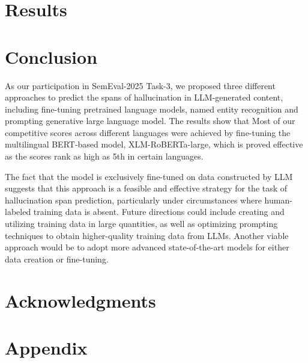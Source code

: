 \documentclass[11pt]{article}
\begin{document}
\section{Results}


\section{Conclusion}
As our participation in SemEval-2025 Task-3, we proposed three different approaches to predict the spans of hallucination in LLM-generated content, including fine-tuning pretrained language models, named entity recognition and prompting generative large language model. The results show that
Most of our competitive scores across different languages were achieved by fine-tuning the multilingual BERT-based model, XLM-RoBERTa-large, which is proved effective as the scores rank as high as 5th in certain languages.

The fact that the model is exclusively fine-tuned on data constructed by LLM suggests that this approach is a feasible and effective strategy for the task of hallucination span prediction, particularly under circumstances where human-labeled training data is absent. Future directions could include creating and utilizing training data in large quantities, as well as optimizing prompting techniques to obtain higher-quality training data from LLMs. Another viable approach would be to adopt more advanced state-of-the-art models for either data creation or fine-tuning.





\section{Acknowledgments}






\appendix
\section{Appendix}
\end{document}
